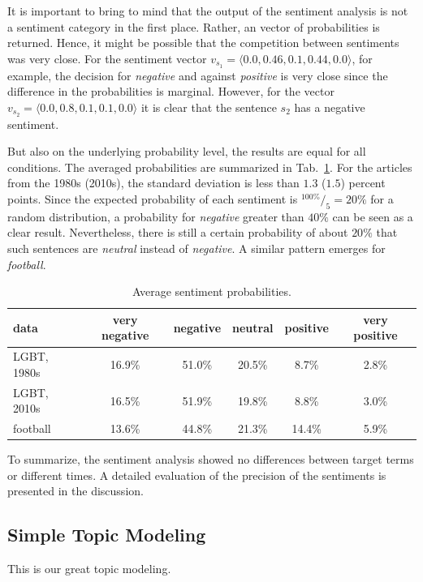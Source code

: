 \documentclass[10pt,a4paper,twocolumn]{scrartcl}
\begin{document}
It is important to bring to mind that the output of the sentiment analysis is not a sentiment category in the first place. Rather, an vector of probabilities is returned.  Hence, it might be possible that the competition between sentiments was very close. For the sentiment vector $v_{s_1} = \langle 0.0, 0.46, 0.1, 0.44, 0.0\rangle$, for example, the decision for \textit{negative} and against \textit{positive} is very close since the difference in the probabilities is marginal. However, for the vector $v_{s_2} = \langle 0.0, 0.8, 0.1, 0.1, 0.0\rangle$ it is clear that the sentence $s_2$ has a negative sentiment.

But also on the underlying probability level, the results are equal for all conditions. The averaged probabilities are summarized in Tab.~\ref{tab:prob}. For the articles from the 1980s (2010s), the standard deviation is less than $1.3$ ($1.5$) percent points. Since the expected probability of each sentiment is $^{100\%}/_{5} = 20\%$  for a random distribution, a probability for \textit{negative} greater than $40\%$ can be seen as a clear result. Nevertheless, there is still a certain probability of about $20\%$ that such sentences are \textit{neutral} instead of \textit{negative}. A similar pattern emerges for \textit{football}.

\begin{table}
\centering
\caption{Average sentiment probabilities.} \label{tab:prob}
\begin{tabular}{lccccc}
\toprule
data & very negative & negative & neutral & positive & very positive\\
\midrule
LGBT, 1980s & 16.9\% & 51.0\% & 20.5\% & 8.7\% & 2.8\%\\
LGBT, 2010s & 16.5\% & 51.9\% & 19.8\% & 8.8\% & 3.0\%\\
football &  13.6\% & 44.8\% & 21.3\% & 14.4\% & 5.9\%\\
\bottomrule
\end{tabular}
\end{table}

To summarize, the sentiment analysis showed no differences between target terms or different times. A detailed evaluation of the precision of the sentiments is presented in the discussion.

\subsection{Simple Topic Modeling}
This is our great topic modeling.
\end{document}
